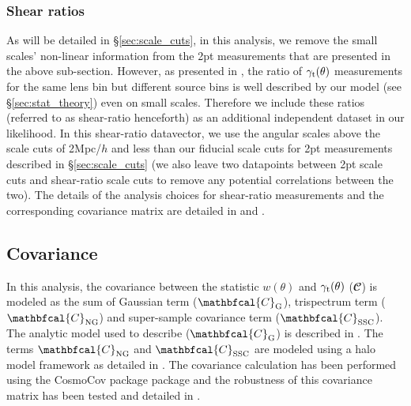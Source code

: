 \documentclass[aps, prd,twocolumn,superscriptaddress,nofootinbib,preprintnumbers]{revtex4-1}
\newcommand{\gammat}{\ensuremath{\gamma_{\rm t}(\theta)}}
\newcommand{\wtheta}{\ensuremath{w(\theta)}}
\newcommand{\SP}[1]{{\color{red}[SP: #1]}}
\begin{document}
\subsubsection{Shear ratios}\label{sec:shear_ratio}
As will be detailed in \S\ref{sec:scale_cuts}, in this analysis, we remove the small scales' non-linear information from the 2pt measurements that are presented in the above sub-section. However, as presented in \citet*{y3-shearratio}, the ratio of $\gammat$ measurements for the same lens bin but different source bins is well described by our model (see \S\ref{sec:stat_theory}) even on small scales. Therefore we include these ratios (referred to as shear-ratio henceforth) as an additional independent dataset in our likelihood. In this shear-ratio datavector, we use the angular scales above the scale cuts of 2Mpc/$h$ and less than our fiducial scale cuts for 2pt measurements described in \S\ref{sec:scale_cuts} (we also leave two datapoints between 2pt scale cuts and shear-ratio scale cuts to remove any potential correlations between the two). The details of the analysis choices for shear-ratio measurements and the corresponding covariance matrix are detailed in \citet*{y3-shearratio} and \citet*{y3-3x2ptkp}. 





\subsection{Covariance}
\label{sec:cov}

In this analysis, the covariance between the statistic $\wtheta$ and $\gammat$ (${\mathbfcal{C}}$) is modeled as the sum of Gaussian term ($\mathbfcal{C}_{\rm G}$), trispectrum term ($\mathbfcal{C}_{\rm NG}$) and super-sample covariance term ($\mathbfcal{C}_{\rm SSC}$). The analytic model used to describe ($\mathbfcal{C}_{\rm G}$) is described in \cite{y3-covariances}. The terms $\mathbfcal{C}_{\rm NG}$ and $\mathbfcal{C}_{\rm SSC}$ are modeled using a halo model framework as detailed in \cite{Krause:2016jvl, Krause2017}. The covariance calculation has been performed using the CosmoCov package \citep{Fang:2020vhc} package and the robustness of this covariance matrix has been tested and detailed in \cite{y3-covariances}. 
\end{document}
